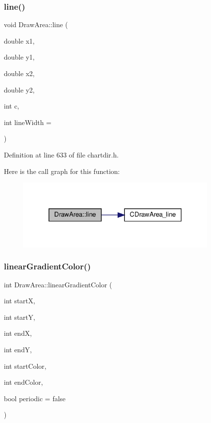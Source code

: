 \subsubsection{\texorpdfstring{line()}{line()}}
{\footnotesize\ttfamily void Draw\+Area\+::line (\begin{DoxyParamCaption}\item[{double}]{x1,  }\item[{double}]{y1,  }\item[{double}]{x2,  }\item[{double}]{y2,  }\item[{int}]{c,  }\item[{int}]{line\+Width = {} }\end{DoxyParamCaption})\hspace{0.3cm}{\ttfamily [inline]}}



Definition at line 633 of file chartdir.\+h.

Here is the call graph for this function\+:
\nopagebreak
\begin{figure}[H]
\begin{center}
\leavevmode
\includegraphics[width=285pt]{class_draw_area_a92722dabd76ce0427c9f5033f0b5754e_cgraph}
\end{center}
\end{figure}
\mbox{\label{class_draw_area_a3dc9d9a2cecdf225f82f0e323642735a}} 
\subsubsection{\texorpdfstring{linear\+Gradient\+Color()}{linearGradientColor()}\hspace{0.1cm}{\footnotesize\ttfamily [1/2]}}
{\footnotesize\ttfamily int Draw\+Area\+::linear\+Gradient\+Color (\begin{DoxyParamCaption}\item[{int}]{startX,  }\item[{int}]{startY,  }\item[{int}]{endX,  }\item[{int}]{endY,  }\item[{int}]{start\+Color,  }\item[{int}]{end\+Color,  }\item[{bool}]{periodic = {\ttfamily false} }\end{DoxyParamCaption})\hspace{0.3cm}{\ttfamily [inline]}}



